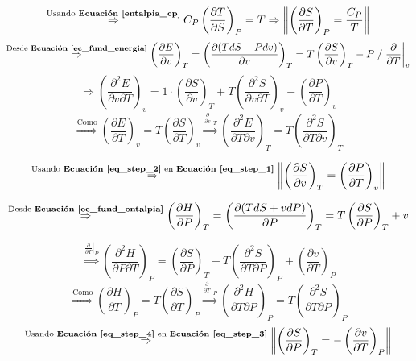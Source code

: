     \[\overset{\text{Usando \textbf{Ecuación \ref{entalpia_cp}}}}{\Rightarrow}C_{P}\left ( \frac{\partial T}{\partial S} \right )_{P}=T\Rightarrow \left \| \left ( \frac{\partial S}{\partial T} \right )_{P}=\frac{C_{P}}{T} \right \|\]
    \[\overset{\text{Desde \textbf{Ecuación \ref{ec_fund_energia}}}}{\Rightarrow}\left ( \frac{\partial E}{\partial v} \right )_{T}=\left ( \frac{\partial (TdS-Pdv)}{\partial v} \right )_{T}=T\left ( \frac{\partial S}{\partial v} \right )_{T}-P\;/\left . \frac{\partial}{\partial T} \right |_{v}\]
    \begin{equation}
    \label{eq_step_1}
        \Rightarrow \left ( \frac{\partial^{2}E}{\partial v \partial T}\right )_{v}=1\cdot \left ( \frac{\partial S}{\partial v} \right )_{T} + T\left ( \frac{\partial^{2}S}{\partial v \partial T} \right )_{v} - \left ( \frac{\partial P}{\partial T} \right )_{v}
    \end{equation}
    \begin{equation}
    \label{eq_step_2}
        \overset{\text{Como}}{\Rightarrow} \left ( \frac{\partial E}{\partial T} \right )_{v}=T \left ( \frac{\partial S}{\partial T} \right )_{v}\overset{\left . \frac{\partial}{\partial v} \right |_{T}}{\Rightarrow} \left ( \frac{\partial^{2} E}{\partial T \partial v} \right )_{T}=T \left ( \frac{\partial^{2} S}{\partial T \partial v} \right )_{T}
    \end{equation}
    
    \[\overset{\text{Usando \textbf{Ecuación \ref{eq_step_2}} en \textbf{Ecuación \ref{eq_step_1}}}}{\Rightarrow} \left \| \left ( \frac{\partial S}{\partial v} \right )_{T}=\left ( \frac{\partial P}{\partial T} \right )_{v} \right \|\]
    
    \[\overset{\text{Desde \textbf{Ecuación \ref{ec_fund_entalpia}}}}{\Rightarrow} \left( \frac{\partial H}{\partial P} \right )_{T}=\left( \frac{\partial (TdS+vdP)}{\partial P} \right )_{T}=T\left ( \frac{\partial S}{\partial P} \right )_{T}+v\]
    
    \begin{equation}
    \label{eq_step_3}
        \overset{\left . \frac{\partial}{\partial T} \right |_{P}}{\Rightarrow} \left ( \frac{\partial^{2}H}{\partial P \partial T} \right )_{P} = \left ( \frac{\partial S}{\partial P} \right )_{T}+T\left ( \frac{\partial^{2} S}{\partial T \partial P} \right )_{P}+\left ( \frac{\partial v}{\partial T} \right )_{P}
    \end{equation}
    \begin{equation}
    \label{eq_step_4}
        \overset{\text{Como}}{\Rightarrow} \left ( \frac{\partial H}{\partial T} \right )_{P}=T \left ( \frac{\partial S}{\partial T} \right )_{P}\overset{\left . \frac{\partial}{\partial T} \right |_{P}}{\Rightarrow} \left ( \frac{\partial^{2} H}{\partial T \partial P} \right )_{P}=T \left ( \frac{\partial^{2} S}{\partial T \partial P} \right )_{P}
    \end{equation}
    \[\overset{\text{Usando \textbf{Ecuación \ref{eq_step_4}} en \textbf{Ecuación \ref{eq_step_3}}}}{\Rightarrow} \left \| \left ( \frac{\partial S}{\partial P} \right )_{T}=-\left ( \frac{\partial v}{\partial T} \right )_{P} \right \|\]
    \newpage
    
